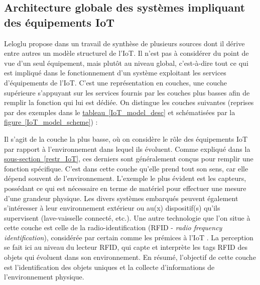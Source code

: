 \documentclass[]{article}
\newcommand{\minit}[1]{\noindent{\small\textbf{ \underline{#1}}}\vspace{0.2cm}}
\newcommand{\wordlink}[2]{\hyperref[#1]{#2~\ref{#1}}}
\begin{document}
\newpage

\subsection{Architecture globale des systèmes impliquant des équipements IoT}

Leloglu propose dans \cite{Leloglu2017} un travail de synthèse de plusieurs sources dont il dérive entre autres un modèle structurel de l'IoT. Il n'est pas à considérer du point de vue d'un seul équipement, mais plutôt au niveau global, c'est-à-dire tout ce qui est impliqué dans le fonctionnement d'un système exploitant les services d'équipements de l'IoT. C'est une représentation en couches, une couche supérieure s'appuyant sur les services fournis par les couches plus basses afin de remplir la fonction qui lui est dédiée. On distingue les couches suivantes (reprises par des exemples dans le \wordlink{IoT_model_desc}{tableau} et schématisées par la \wordlink{IoT_model_scheme}{figure}) :\\

\minit{La couche perception}

Il s'agit de la couche la plus basse, où on considère le rôle des équipements IoT par rapport à l'environnement dans lequel ils évoluent. Comme expliqué dans la \wordlink{restr_IoT}{sous-section}, ces derniers sont généralement conçus pour remplir une fonction spécifique. C'est dans cette couche qu'elle prend tout son sens, car elle dépend souvent de l'environnement. L'exemple le plus évident est les capteurs, possédant ce qui est nécessaire en terme de matériel pour effectuer une mesure d'une grandeur physique. Les divers systèmes embarqués peuvent également s'intéresser à leur environnement extérieur ou au(x) dispositif(s) qu'ils supervisent (lave-vaisselle connecté, etc.). Une autre technologie que l'on situe à cette couche est celle de la radio-identification (RFID - \textit{radio frequency identification}), considérée par certain comme les prémices à l'IoT \cite{Berte2018}. La perception se fait ici au niveau du lecteur RFID, qui capte et interprète les tags RFID des objets qui évoluent dans son environnement. En résumé, l'objectif de cette couche est l'identification des objets uniques et la collecte d'informations de l'environnement physique.\\ 

\minit{La couche réseau}
\end{document}
